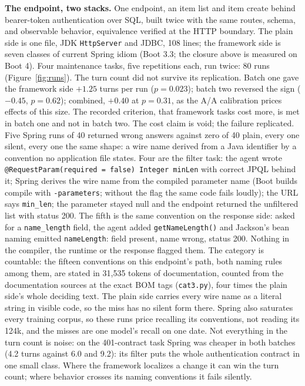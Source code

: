 \documentclass[journal]{IEEEtran}
\begin{document}
\textbf{The endpoint, two stacks.} One endpoint, an item list and item
create behind bearer-token authentication over SQL, built twice with
the same routes, schema, and observable behavior, equivalence verified
at the HTTP boundary. The plain side is one file, JDK
\texttt{HttpServer} and JDBC, 108 lines; the framework side is seven
classes of current Spring idiom (Boot 3.3; the closure above is
measured on Boot 4). Four maintenance tasks, five repetitions each,
run twice: 80 runs (Figure~\ref{fig:runs}). The turn count did not
survive its replication. Batch one gave the framework side $+1.25$
turns per run ($p = 0.023$); batch two reversed the sign ($-0.45$,
$p = 0.62$); combined, $+0.40$ at $p = 0.31$, as the A/A calibration
prices effects of this size. The recorded criterion, that framework
tasks cost more, is met in batch one and not in batch two. The cost
claim is void; the failure replicated. Five Spring runs of 40 returned wrong answers against
zero of 40 plain, every one silent, every one the same shape: a wire
name derived from a Java identifier by a convention no application
file states. Four are the filter task: the agent wrote
\texttt{@RequestParam(required = false) Integer minLen} with correct
JPQL behind it; Spring derives the wire name from the compiled
parameter name (Boot builds compile with \texttt{-parameters}; without
the flag the same code fails loudly); the URL
says \texttt{min\_len}; the parameter stayed null and the endpoint
returned the unfiltered list with status 200. The fifth is the same
convention on the response side: asked for a \texttt{name\_length}
field, the agent added \texttt{getNameLength()} and Jackson's bean
naming emitted \texttt{nameLength}: field present, name wrong, status
200. Nothing in the compiler, the runtime or the response flagged
them. The category is countable: the fifteen conventions on this
endpoint's path, both naming rules among them, are stated in 31,535
tokens of documentation, counted from the documentation sources at the
exact BOM tags (\texttt{cat3.py}), four times the plain side's whole
deciding text. The plain side carries every
wire name as a literal string in visible code, so the miss has no
silent form there. Spring also saturates every training corpus, so
these runs price recalling its conventions, not reading its 124k, and
the misses are one model's recall on one date. Not everything in the
turn count is noise: on the 401-contract task Spring
was cheaper in both batches (4.2 turns against 6.0 and 9.2): its
filter puts the whole authentication contract in one small class.
Where the framework localizes a change it can win the turn count;
where behavior crosses its naming conventions it fails silently.
\end{document}
